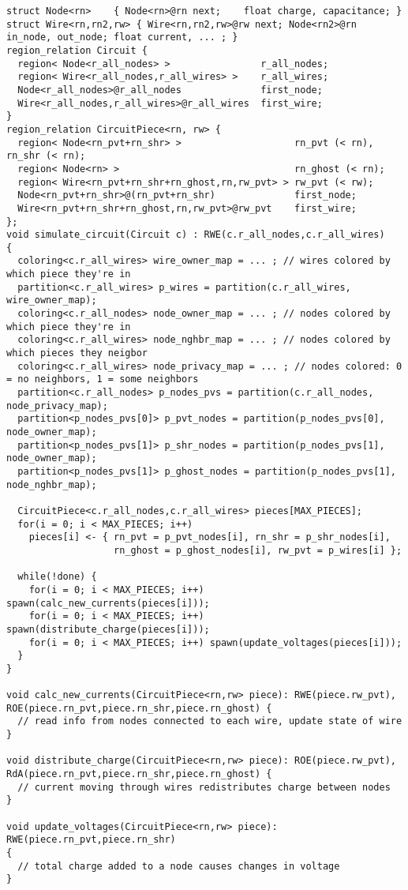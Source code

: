 \begin{lstlisting}[float]
struct Node<rn>    { Node<rn>@rn next;    float charge, capacitance; }
struct Wire<rn,rn2,rw> { Wire<rn,rn2,rw>@rw next; Node<rn2>@rn in_node, out_node; float current, ... ; }
region_relation Circuit {
  region< Node<r_all_nodes> >                r_all_nodes;
  region< Wire<r_all_nodes,r_all_wires> >    r_all_wires;
  Node<r_all_nodes>@r_all_nodes              first_node;
  Wire<r_all_nodes,r_all_wires>@r_all_wires  first_wire;
}
region_relation CircuitPiece<rn, rw> {
  region< Node<rn_pvt+rn_shr> >                    rn_pvt (< rn), rn_shr (< rn);
  region< Node<rn> >                               rn_ghost (< rn);
  region< Wire<rn_pvt+rn_shr+rn_ghost,rn,rw_pvt> > rw_pvt (< rw);
  Node<rn_pvt+rn_shr>@(rn_pvt+rn_shr)              first_node;
  Wire<rn_pvt+rn_shr+rn_ghost,rn,rw_pvt>@rw_pvt    first_wire;
};
void simulate_circuit(Circuit c) : RWE(c.r_all_nodes,c.r_all_wires)
{
  coloring<c.r_all_wires> wire_owner_map = ... ; // wires colored by which piece they're in
  partition<c.r_all_wires> p_wires = partition(c.r_all_wires, wire_owner_map);
  coloring<c.r_all_nodes> node_owner_map = ... ; // nodes colored by which piece they're in
  coloring<c.r_all_wires> node_nghbr_map = ... ; // nodes colored by which pieces they neigbor
  coloring<c.r_all_wires> node_privacy_map = ... ; // nodes colored: 0 = no neighbors, 1 = some neighbors
  partition<c.r_all_nodes> p_nodes_pvs = partition(c.r_all_nodes, node_privacy_map);
  partition<p_nodes_pvs[0]> p_pvt_nodes = partition(p_nodes_pvs[0], node_owner_map);
  partition<p_nodes_pvs[1]> p_shr_nodes = partition(p_nodes_pvs[1], node_owner_map);
  partition<p_nodes_pvs[1]> p_ghost_nodes = partition(p_nodes_pvs[1], node_nghbr_map);

  CircuitPiece<c.r_all_nodes,c.r_all_wires> pieces[MAX_PIECES];
  for(i = 0; i < MAX_PIECES; i++) 
    pieces[i] <- { rn_pvt = p_pvt_nodes[i], rn_shr = p_shr_nodes[i],
                   rn_ghost = p_ghost_nodes[i], rw_pvt = p_wires[i] };

  while(!done) {
    for(i = 0; i < MAX_PIECES; i++) spawn(calc_new_currents(pieces[i]));
    for(i = 0; i < MAX_PIECES; i++) spawn(distribute_charge(pieces[i]));
    for(i = 0; i < MAX_PIECES; i++) spawn(update_voltages(pieces[i]));
  }
}

void calc_new_currents(CircuitPiece<rn,rw> piece): RWE(piece.rw_pvt), ROE(piece.rn_pvt,piece.rn_shr,piece.rn_ghost) {
  // read info from nodes connected to each wire, update state of wire
}

void distribute_charge(CircuitPiece<rn,rw> piece): ROE(piece.rw_pvt), RdA(piece.rn_pvt,piece.rn_shr,piece.rn_ghost) {
  // current moving through wires redistributes charge between nodes
}

void update_voltages(CircuitPiece<rn,rw> piece): RWE(piece.rn_pvt,piece.rn_shr)
{
  // total charge added to a node causes changes in voltage
}
\end{lstlisting}
